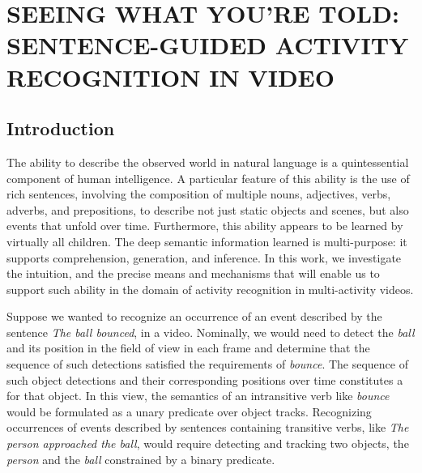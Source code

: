\chapter{SEEING WHAT YOU'RE TOLD: SENTENCE-GUIDED ACTIVITY RECOGNITION IN
  VIDEO}
\label{chapter:cvpr2014e}

\section{Introduction}
\label{sec-st1:introduction}
%
The ability to describe the observed world in natural language is a
quintessential component of human intelligence.
%
A particular feature of this ability is the use of rich sentences, involving
the composition of multiple nouns, adjectives, verbs, adverbs, and
prepositions, to describe not just static objects and scenes, but also events
that unfold over time.
%
Furthermore, this ability appears to be learned by virtually all children.
%
The deep semantic information learned is multi-purpose: it supports
comprehension, generation, and inference.
%
In this work, we investigate the intuition, and the precise means and
mechanisms that will enable us to support such ability in the domain of
activity recognition in multi-activity videos.

Suppose we wanted to recognize an occurrence of an event described by the
sentence \emph{The ball bounced}, in a video.
%
Nominally, we would need to detect the \emph{ball} and its position in the
field of view in each frame and determine that the sequence of such detections
satisfied the requirements of \emph{bounce}.
%
The sequence of such object detections and their corresponding positions over
time constitutes a  for that object.
%
In this view, the semantics of an intransitive verb like \emph{bounce} would be
formulated as a unary predicate over object tracks.
%
Recognizing occurrences of events described by sentences containing transitive
verbs, like \emph{The person approached the ball}, would require detecting and
tracking two objects, the \emph{person} and the \emph{ball} constrained by a
binary predicate.

